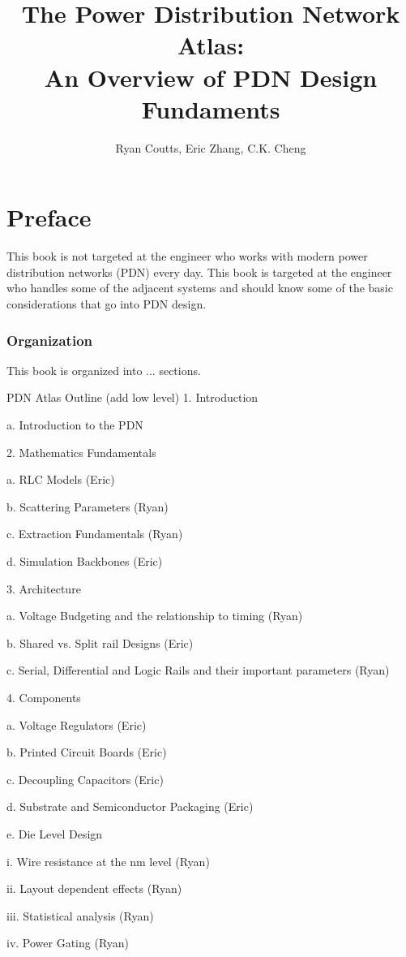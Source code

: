 \documentclass{book}
\title{The Power Distribution Network Atlas:\\ 
  An Overview of PDN Design Fundaments }
\author{Ryan Coutts, Eric Zhang, C.K. Cheng}
\date{ }
\begin{document}
\maketitle
\tableofcontents

\chapter{Preface}

This book is not targeted at the engineer who works with modern power distribution networks (PDN) every day.  This book is targeted at the engineer who handles some of the adjacent systems and should know some of the basic considerations that go into PDN design.  

\subsection*{Organization}
This book is organized into ... sections.

PDN Atlas Outline (add low level)
1.	Introduction 

 a.	Introduction to the PDN 

2.	Mathematics Fundamentals

a.	RLC Models (Eric)

b.	Scattering Parameters (Ryan)

c.	Extraction Fundamentals (Ryan)

d.	Simulation Backbones (Eric)

3.	Architecture

a.	Voltage Budgeting and the relationship to timing (Ryan)

b.	Shared vs. Split rail Designs (Eric)

c.	Serial, Differential and Logic Rails and their important parameters (Ryan)

4.	Components

a.	Voltage Regulators (Eric)

b.	Printed Circuit Boards (Eric)

c.	Decoupling Capacitors (Eric)

d.	Substrate and Semiconductor Packaging (Eric)

e.	Die Level Design

i.	Wire resistance at the nm level (Ryan)

ii.	Layout dependent effects (Ryan)

iii.	Statistical analysis (Ryan)

iv.	Power Gating (Ryan)
\end{document}
